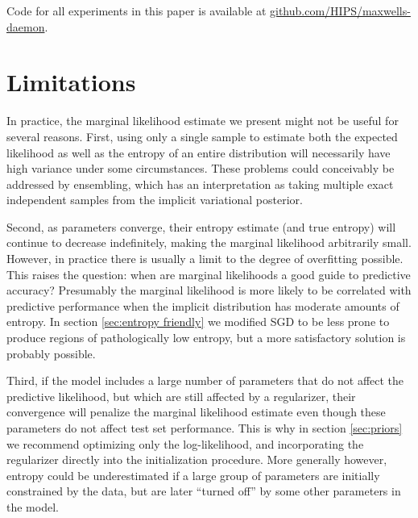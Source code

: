 \documentclass[]{article}
\begin{document}
Code for all experiments in this paper is available at \url{github.com/HIPS/maxwells-daemon}.

\section{Limitations}
\label{sec:limitations}
In practice, the marginal likelihood estimate we present might not be useful for several reasons.
First, using only a single sample to estimate both the expected likelihood as well as the entropy of an entire distribution will necessarily have high variance under some circumstances.
These problems could conceivably be addressed by ensembling, which has an interpretation as taking multiple exact independent samples from the implicit variational posterior.

Second, as parameters converge, their entropy estimate (and true entropy) will continue to decrease indefinitely, making the marginal likelihood arbitrarily small.
However, in practice there is usually a limit to the degree of overfitting possible.
This raises the question: when are marginal likelihoods a good guide to predictive accuracy?
Presumably the marginal likelihood is more likely to be correlated with predictive performance when the
implicit distribution has moderate amounts of entropy.
In section \ref{sec:entropy friendly} we modified SGD to be less prone to produce regions of pathologically low entropy, but a more satisfactory solution is probably possible.

Third, if the model includes a large number of parameters that do not affect the predictive likelihood, but which are still affected by a regularizer, their convergence will penalize the marginal likelihood estimate even though these parameters do not affect test set performance.
This is why in section \ref{sec:priors} we recommend optimizing only the log-likelihood, and incorporating the regularizer directly into the initialization procedure.
More generally however, entropy could be underestimated if a large group of parameters are initially constrained by the data, but are later ``turned off'' by some other parameters in the model.
\end{document}
